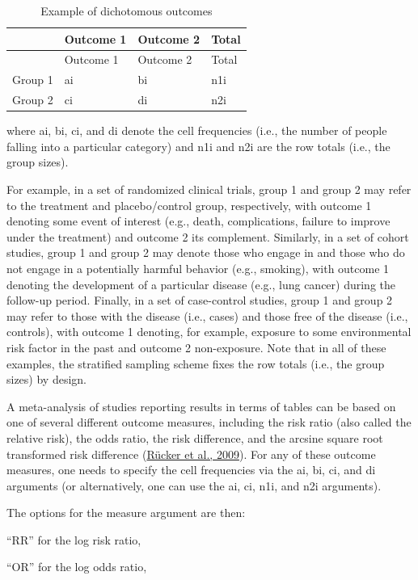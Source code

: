 \documentclass[
  11pt,
]{article}
\begin{document}
\begin{longtable}[]{@{}llll@{}}
\caption{Example of dichotomous outcomes}\tabularnewline
\toprule
& Outcome 1 & Outcome 2 & Total \\
\midrule
\endfirsthead
\toprule
& Outcome 1 & Outcome 2 & Total \\
\midrule
\endhead
Group 1 & ai & bi & n1i \\
Group 2 & ci & di & n2i \\
\bottomrule
\end{longtable}

where ai, bi, ci, and di denote the cell frequencies (i.e., the number of people falling into a particular category) and n1i and n2i are the row totals (i.e., the group sizes).

For example, in a set of randomized clinical trials, group 1 and group 2 may refer to the treatment and placebo/control group, respectively, with outcome 1 denoting some event of interest (e.g., death, complications, failure to improve under the treatment) and outcome 2 its complement. Similarly, in a set of cohort studies, group 1 and group 2 may denote those who engage in and those who do not engage in a potentially harmful behavior (e.g., smoking), with outcome 1 denoting the development of a particular disease (e.g., lung cancer) during the follow-up period. Finally, in a set of case-control studies, group 1 and group 2 may refer to those with the disease (i.e., cases) and those free of the disease (i.e., controls), with outcome 1 denoting, for example, exposure to some environmental risk factor in the past and outcome 2 non-exposure. Note that in all of these examples, the stratified sampling scheme fixes the row totals (i.e., the group sizes) by design.

A meta-analysis of studies reporting results in terms of tables can be based on one of several different outcome measures, including the risk ratio (also called the relative risk), the odds ratio, the risk difference, and the arcsine square root transformed risk difference (\protect\hyperlink{ref-Ruxfccker2009}{Rücker et al., 2009}). For any of these outcome measures, one needs to specify the cell frequencies via the ai, bi, ci, and di arguments (or alternatively, one can use the ai, ci, n1i, and n2i arguments).

The options for the measure argument are then:

``RR'' for the log risk ratio,

``OR'' for the log odds ratio,
\end{document}
